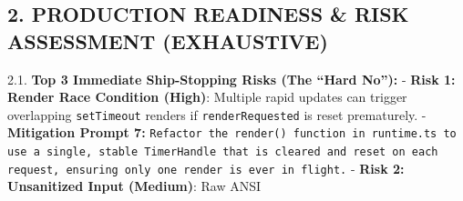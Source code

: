\subsection{2. PRODUCTION READINESS \& RISK ASSESSMENT (EXHAUSTIVE)}\label{record-415-production-readiness-risk-assessment-exhaustive}

2.1. \textbf{Top 3 Immediate Ship-Stopping Risks (The ``Hard No''):} - \textbf{Risk 1: Render Race Condition (High)}: Multiple rapid updates can trigger overlapping \texttt{s\allowbreak{}e\allowbreak{}t\allowbreak{}T\allowbreak{}i\allowbreak{}m\allowbreak{}e\allowbreak{}o\allowbreak{}u\allowbreak{}t} renders if \texttt{r\allowbreak{}e\allowbreak{}n\allowbreak{}d\allowbreak{}e\allowbreak{}r\allowbreak{}R\allowbreak{}e\allowbreak{}q\allowbreak{}u\allowbreak{}e\allowbreak{}s\allowbreak{}t\allowbreak{}e\allowbreak{}d} is reset prematurely. - \textbf{Mitigation Prompt 7:} \texttt{R\allowbreak{}e\allowbreak{}f\allowbreak{}a\allowbreak{}c\allowbreak{}t\allowbreak{}o\allowbreak{}r\allowbreak{} \allowbreak{}t\allowbreak{}h\allowbreak{}e\allowbreak{} \allowbreak{}r\allowbreak{}e\allowbreak{}n\allowbreak{}d\allowbreak{}e\allowbreak{}r\allowbreak{}(\allowbreak{})\allowbreak{} \allowbreak{}f\allowbreak{}u\allowbreak{}n\allowbreak{}c\allowbreak{}t\allowbreak{}i\allowbreak{}o\allowbreak{}n\allowbreak{} \allowbreak{}i\allowbreak{}n\allowbreak{} \allowbreak{}r\allowbreak{}u\allowbreak{}n\allowbreak{}t\allowbreak{}i\allowbreak{}m\allowbreak{}e\allowbreak{}.\allowbreak{}t\allowbreak{}s\allowbreak{} \allowbreak{}t\allowbreak{}o\allowbreak{} \allowbreak{}u\allowbreak{}s\allowbreak{}e\allowbreak{} \allowbreak{}a\allowbreak{} \allowbreak{}s\allowbreak{}i\allowbreak{}n\allowbreak{}g\allowbreak{}l\allowbreak{}e\allowbreak{},\allowbreak{} \allowbreak{}s\allowbreak{}t\allowbreak{}a\allowbreak{}b\allowbreak{}l\allowbreak{}e\allowbreak{} \allowbreak{}T\allowbreak{}i\allowbreak{}m\allowbreak{}e\allowbreak{}r\allowbreak{}H\allowbreak{}a\allowbreak{}n\allowbreak{}d\allowbreak{}l\allowbreak{}e\allowbreak{} \allowbreak{}t\allowbreak{}h\allowbreak{}a\allowbreak{}t\allowbreak{} \allowbreak{}i\allowbreak{}s\allowbreak{} \allowbreak{}c\allowbreak{}l\allowbreak{}e\allowbreak{}a\allowbreak{}r\allowbreak{}e\allowbreak{}d\allowbreak{} \allowbreak{}a\allowbreak{}n\allowbreak{}d\allowbreak{} \allowbreak{}r\allowbreak{}e\allowbreak{}s\allowbreak{}e\allowbreak{}t\allowbreak{} \allowbreak{}o\allowbreak{}n\allowbreak{} \allowbreak{}e\allowbreak{}a\allowbreak{}c\allowbreak{}h\allowbreak{} \allowbreak{}r\allowbreak{}e\allowbreak{}q\allowbreak{}u\allowbreak{}e\allowbreak{}s\allowbreak{}t\allowbreak{},\allowbreak{} \allowbreak{}e\allowbreak{}n\allowbreak{}s\allowbreak{}u\allowbreak{}r\allowbreak{}i\allowbreak{}n\allowbreak{}g\allowbreak{} \allowbreak{}o\allowbreak{}n\allowbreak{}l\allowbreak{}y\allowbreak{} \allowbreak{}o\allowbreak{}n\allowbreak{}e\allowbreak{} \allowbreak{}r\allowbreak{}e\allowbreak{}n\allowbreak{}d\allowbreak{}e\allowbreak{}r\allowbreak{} \allowbreak{}i\allowbreak{}s\allowbreak{} \allowbreak{}e\allowbreak{}v\allowbreak{}e\allowbreak{}r\allowbreak{} \allowbreak{}i\allowbreak{}n\allowbreak{} \allowbreak{}f\allowbreak{}l\allowbreak{}i\allowbreak{}g\allowbreak{}h\allowbreak{}t\allowbreak{}.} - \textbf{Risk 2: Unsanitized Input (Medium)}: Raw ANSI 